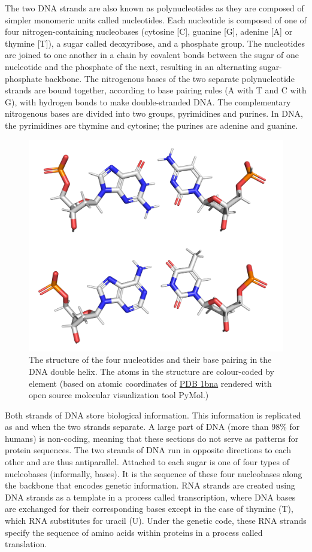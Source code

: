 The two DNA strands are also known as polynucleotides as they are composed of simpler monomeric units called nucleotides. Each nucleotide is composed of one of four nitrogen-containing nucleobases (cytosine {[}C{]}, guanine {[}G{]}, adenine {[}A{]} or thymine {[}T{]}), a sugar called deoxyribose, and a phosphate group. The nucleotides are joined to one another in a chain by covalent bonds between the sugar of one nucleotide and the phosphate of the next, resulting in an alternating sugar-phosphate backbone. The nitrogenous bases of the two separate polynucleotide strands are bound together, according to base pairing rules (A with T and C with G), with hydrogen bonds to make double-stranded DNA. The complementary nitrogenous bases are divided into two groups, pyrimidines and purines. In DNA, the pyrimidines are thymine and cytosine; the purines are adenine and guanine.



\begin{figure}

{\centering \includegraphics[width=0.7\linewidth]{./figures/dna/bases_hydrogen} 

}

\caption{The structure of the four nucleotides and their base pairing in the DNA double helix. The atoms in the structure are colour-coded by element (based on atomic coordinates of \href{https://www.rcsb.org/structure/1bna}{PDB 1bna} rendered with open source molecular visualization tool PyMol.)}\label{fig:basestruc}
\end{figure}

Both strands of DNA store biological information. This information is replicated as and when the two strands separate. A large part of DNA (more than 98\% for humans) is non-coding, meaning that these sections do not serve as patterns for protein sequences. The two strands of DNA run in opposite directions to each other and are thus antiparallel. Attached to each sugar is one of four types of nucleobases (informally, bases). It is the sequence of these four nucleobases along the backbone that encodes genetic information. RNA strands are created using DNA strands as a template in a process called transcription, where DNA bases are exchanged for their corresponding bases except in the case of thymine (T), which RNA substitutes for uracil (U). Under the genetic code, these RNA strands specify the sequence of amino acids within proteins in a process called translation.


